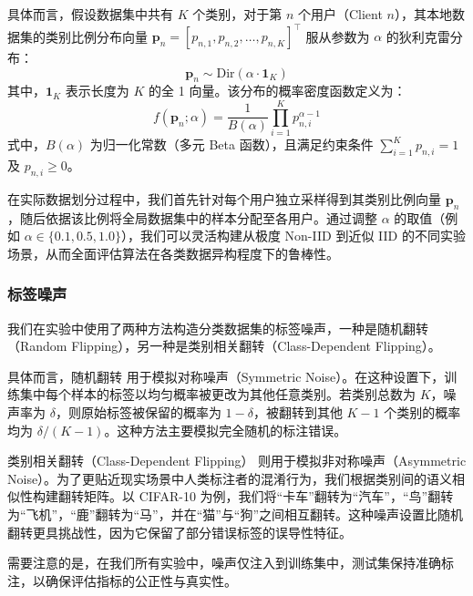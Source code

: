 具体而言，假设数据集中共有 $K$ 个类别，对于第 $n$ 个用户（Client $n$），其本地数据集的类别比例分布向量 $\mathbf{p}_n = [p_{n,1}, p_{n,2}, \dots, p_{n,K}]^\top$ 服从参数为 $\alpha$ 的狄利克雷分布：
\begin{equation}
    \mathbf{p}_n \sim \text{Dir}(\alpha \cdot \mathbf{1}_K)
\end{equation}
其中，$\mathbf{1}_K$ 表示长度为 $K$ 的全 1 向量。该分布的概率密度函数定义为：
\begin{equation}
    f(\mathbf{p}_n; \alpha) = \frac{1}{B(\alpha)} \prod_{i=1}^{K} p_{n,i}^{\alpha - 1}
\end{equation}
式中，$B(\alpha)$ 为归一化常数（多元 Beta 函数），且满足约束条件 $\sum_{i=1}^{K} p_{n,i} = 1$ 及 $p_{n,i} \geq 0$。

在实际数据划分过程中，我们首先针对每个用户独立采样得到其类别比例向量 $\mathbf{p}_n$，随后依据该比例将全局数据集中的样本分配至各用户。通过调整 $\alpha$ 的取值（例如 $\alpha \in \{0.1, 0.5, 1.0\}$），我们可以灵活构建从极度 Non-IID 到近似 IID 的不同实验场景，从而全面评估算法在各类数据异构程度下的鲁棒性。

\subsubsection{标签噪声}
我们在实验中使用了两种方法构造分类数据集的标签噪声，一种是随机翻转（Random Flipping），另一种是类别相关翻转（Class-Dependent Flipping）。

具体而言，随机翻转 用于模拟对称噪声（Symmetric Noise）。在这种设置下，训练集中每个样本的标签以均匀概率被更改为其他任意类别。若类别总数为 $K$，噪声率为 $\delta$，则原始标签被保留的概率为 $1-\delta$，被翻转到其他 $K-1$ 个类别的概率均为 $\delta/(K-1)$。这种方法主要模拟完全随机的标注错误。

类别相关翻转（Class-Dependent Flipping） 则用于模拟非对称噪声（Asymmetric Noise）。为了更贴近现实场景中人类标注者的混淆行为，我们根据类别间的语义相似性构建翻转矩阵。以 CIFAR-10 为例，我们将“卡车”翻转为“汽车”，“鸟”翻转为“飞机”，“鹿”翻转为“马”，并在“猫”与“狗”之间相互翻转。这种噪声设置比随机翻转更具挑战性，因为它保留了部分错误标签的误导性特征。

需要注意的是，在我们所有实验中，噪声仅注入到训练集中，测试集保持准确标注，以确保评估指标的公正性与真实性。


